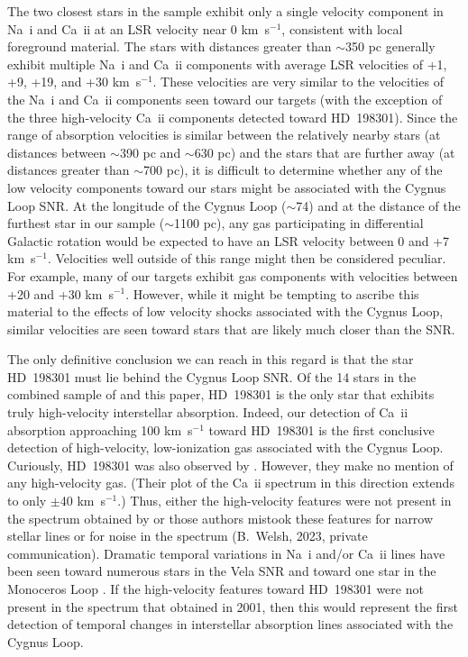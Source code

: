 \documentclass[fleqn,usenatbib]{mnras}
\begin{document}
The two closest stars in the \citet{w02} sample exhibit only a single velocity component in Na~{\sc i} and Ca~{\sc ii} at an LSR velocity near 0 km~s$^{-1}$, consistent with local foreground material. The \citet{w02} stars with distances greater than $\sim$350 pc generally exhibit multiple Na~{\sc i} and Ca~{\sc ii} components with average LSR velocities of +1, +9, +19, and +30 km~s$^{-1}$. These velocities are very similar to the velocities of the Na~{\sc i} and Ca~{\sc ii} components seen toward our targets (with the exception of the three high-velocity Ca~{\sc ii} components detected toward HD~198301). Since the range of absorption velocities is similar between the relatively nearby stars (at distances between $\sim$390 pc and $\sim$630 pc) and the stars that are further away (at distances greater than $\sim$700 pc), it is difficult to determine whether any of the low velocity components toward our stars might be associated with the Cygnus Loop SNR. At the longitude of the Cygnus Loop ($\sim$74\degr) and at the distance of the furthest star in our sample ($\sim$1100 pc), any gas participating in differential Galactic rotation would be expected to have an LSR velocity between 0 and +7 km~s$^{-1}$. Velocities well outside of this range might then be considered peculiar. For example, many of our targets exhibit gas components with velocities between +20 and +30 km~s$^{-1}$. However, while it might be tempting to ascribe this material to the effects of low velocity shocks associated with the Cygnus Loop, similar velocities are seen toward stars that are likely much closer than the SNR.

The only definitive conclusion we can reach in this regard is that the star HD~198301 must lie behind the Cygnus Loop SNR. Of the 14 stars in the combined sample of \citet{w02} and this paper, HD~198301 is the only star that exhibits truly high-velocity interstellar absorption. Indeed, our detection of Ca~{\sc ii} absorption approaching 100 km~s$^{-1}$ toward HD~198301 is the first conclusive detection of high-velocity, low-ionization gas associated with the Cygnus Loop. Curiously, HD~198301 was also observed by \citet{w02}. However, they make no mention of any high-velocity gas. (Their plot of the Ca~{\sc ii} spectrum in this direction extends to only $\pm$40 km~s$^{-1}$.) Thus, either the high-velocity features were not present in the spectrum obtained by \citet{w02} or those authors mistook these features for narrow stellar lines or for noise in the spectrum (B.~Welsh, 2023, private communication). Dramatic temporal variations in Na~{\sc i} and/or Ca~{\sc ii} lines have been seen toward numerous stars in the Vela SNR \citep[e.g.,][]{cs00,ra16,ra17,ra20} and toward one star in the Monoceros Loop \citep{dm16}. If the high-velocity features toward HD~198301 were not present in the spectrum that \citet{w02} obtained in 2001, then this would represent the first detection of temporal changes in interstellar absorption lines associated with the Cygnus Loop.
\end{document}
